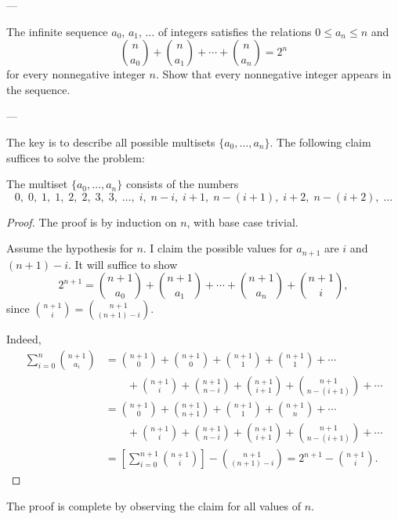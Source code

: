 
---

The infinite sequence $a_0$, $a_1$, $\ldots$ of integers satisfies the relations $0\le a_n\le n$ and
\[\binom n{a_0}+\binom n{a_1}+\cdots+\binom n{a_n}=2^n\]
for every nonnegative integer $n$. Show that every nonnegative integer appears in the sequence.

---

The key is to describe all possible multisets $\{a_0,\ldots,a_n\}$. The following claim suffices to solve the problem:
\begin{claim*}
    The multiset $\{a_0,\ldots,a_n\}$ consists of the numbers
    \[0,\;0,\;1,\;1,\;2,\;2,\;3,\;3,\;\ldots,\;i,\;n-i,\;i+1,\;n-(i+1),\;i+2,\;n-(i+2),\;\ldots\]
\end{claim*}
\begin{proof}
    The proof is by induction on $n$, with base case trivial.

    Assume the hypothesis for $n$. I claim the possible values for $a_{n+1}$ are $i$ and $(n+1)-i$. It will suffice to show
    \[2^{n+1}=\binom{n+1}{a_0}+\binom{n+1}{a_1}+\cdots+\binom{n+1}{a_n}+\binom{n+1}i,\]
    since $\binom{n+1}i=\binom{n+1}{(n+1)-i}$.

    Indeed,
    \begin{align*}
        \sum_{i=0}^n\binom{n+1}{a_i}
        &=\binom{n+1}0+\binom{n+1}0+\binom{n+1}1+\binom{n+1}1+\cdots\\
        &\qquad+\binom{n+1}i+\binom{n+1}{n-i}+\binom{n+1}{i+1}+\binom{n+1}{n-(i+1)}+\cdots\\
        &=\binom{n+1}0+\binom{n+1}{n+1}+\binom{n+1}1+\binom{n+1}n+\cdots\\
        &\qquad+\binom{n+1}i+\binom{n+1}{n-i}+\binom{n+1}{i+1}+\binom{n+1}{n-(i+1)}+\cdots\\
        &=\left[\sum_{i=0}^{n+1}\binom{n+1}i\right]-\binom{n+1}{(n+1)-i}
        =2^{n+1}-\binom{n+1}i.
    \end{align*}
\end{proof}
The proof is complete by observing the claim for all values of $n$.

